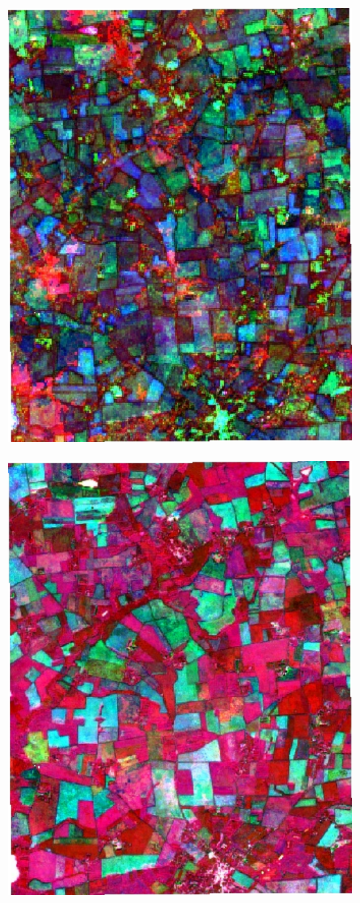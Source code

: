 \documentclass[journal,article,submit,pdftex,moreauthors]{Definitions/mdpi}
\begin{document}
\begin{figure}[H]
\begin{subfigure}[t]{0.23\linewidth}
    \caption{}
	\label{fig:color_map_d}
	\end{subfigure}\\[0.2cm]
    \begin{subfigure}[t]{0.23\linewidth}
		\centering
	\includegraphics[height=\linewidth,width=0.95\linewidth]{figures/aes_1_layer_mse_results/composites/composite_image_456657.pdf}
    \caption{}
	\label{fig:color_map_e}
	\end{subfigure}
    \begin{subfigure}[t]{0.23\linewidth}
		\centering
	\includegraphics[height=\linewidth,width=0.95\linewidth]{figures/aes_1_layer_mse_results/composites/composite_image_201032.pdf}

\end{subfigure}
\end{figure}
\end{document}

